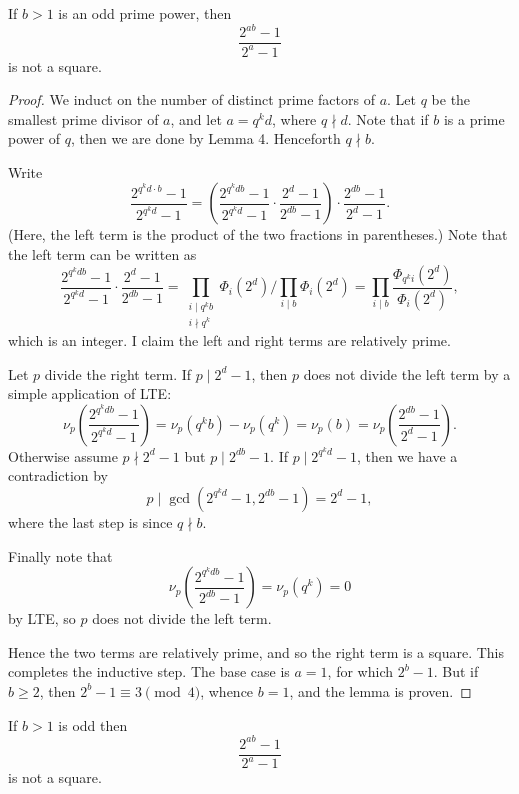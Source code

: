 \begin{lemma}
    If $b>1$ is an odd prime power, then \[\frac{2^{ab}-1}{2^a-1}\]
    is not a square.
\end{lemma}
\begin{proof}
    We induct on the number of distinct prime factors of $a$. Let $q$ be the smallest prime divisor of $a$, and let $a=q^kd$, where $q\nmid d$. Note that if $b$ is a prime power of $q$, then we are done by Lemma 4. Henceforth $q\nmid b$.

    Write \[\frac{2^{q^kd\cdot b}-1}{2^{q^kd}-1}=\left(\frac{2^{q^kdb}-1}{2^{q^kd}-1}\cdot\frac{2^d-1}{2^{db}-1}\right)\cdot\frac{2^{db}-1}{2^d-1}.\]
    (Here, the left term is the product of the two fractions in parentheses.) Note that the left term can be written as \[\frac{2^{q^kdb}-1}{2^{q^kd}-1}\cdot\frac{2^d-1}{2^{db}-1}=\prod_{\substack{i\mid q^kb\\ i\nmid q^k}}\Phi_i(2^d)\bigg/\prod_{i\mid b}\Phi_i(2^d)=\prod_{i\mid b}\frac{\Phi_{q^ki}(2^d)}{\Phi_i(2^d)},\]
    which is an integer. I claim the left and right terms are relatively prime.

    Let $p$ divide the right term. If $p\mid2^d-1$, then $p$ does not divide the left term by a simple application of LTE: \[\nu_p\left(\frac{2^{q^kdb}-1}{2^{q^kd}-1}\right)=\nu_p\left(q^kb\right)-\nu_p\left(q^k\right)=\nu_p(b)=\nu_p\left(\frac{2^{db}-1}{2^d-1}\right).\]
    Otherwise assume $p\nmid2^d-1$ but $p\mid2^{db}-1$. If $p\mid2^{q^kd}-1$, then we have a contradiction by \[p\mid\gcd\left(2^{q^kd}-1,2^{db}-1\right)=2^d-1,\]
    where the last step is since $q\nmid b$.

    Finally note that \[\nu_p\left(\frac{2^{q^kdb}-1}{2^{db}-1}\right)=\nu_p\left(q^k\right)=0\]
    by LTE, so $p$ does not divide the left term.

    Hence the two terms are relatively prime, and so the right term is a square. This completes the inductive step. The base case is $a=1$, for which $2^b-1$. But if $b\ge2$, then $2^b-1\equiv3\pmod4$, whence $b=1$, and the lemma is proven.
\end{proof}
\begin{lemma}
    If $b>1$ is odd then \[\frac{2^{ab}-1}{2^a-1}\]
    is not a square.
\end{lemma}
